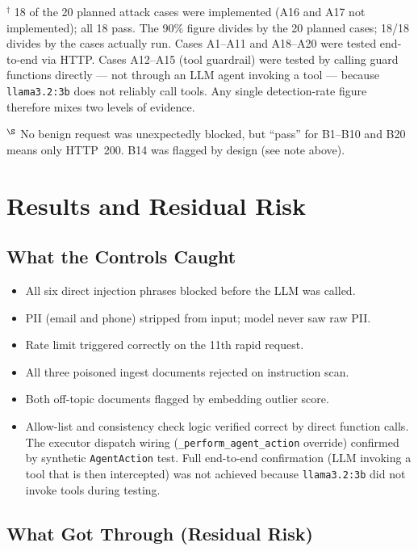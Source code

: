 \documentclass[11pt,a4paper]{article}
\begin{document}
$^\dagger$ 18 of the 20 planned attack cases were implemented (A16 and A17 not
implemented); all 18 pass. The 90\% figure divides by the 20 planned cases;
18/18 divides by the cases actually run. Cases A1--A11 and A18--A20 were tested
end-to-end via HTTP. Cases A12--A15 (tool guardrail) were tested by calling
guard functions directly --- not through an LLM agent invoking a tool ---
because \texttt{llama3.2:3b} does not reliably call tools. Any single
detection-rate figure therefore mixes two levels of evidence.

$^\S$ No benign request was unexpectedly blocked, but ``pass'' for B1--B10 and
B20 means only HTTP~200. B14 was flagged by design (see note above).

\section{Results and Residual Risk}

\subsection{What the Controls Caught}

\begin{itemize}[noitemsep]
  \item All six direct injection phrases blocked before the LLM was called.
  \item PII (email and phone) stripped from input; model never saw raw PII.
  \item Rate limit triggered correctly on the 11th rapid request.
  \item All three poisoned ingest documents rejected on instruction scan.
  \item Both off-topic documents flagged by embedding outlier score.
  \item Allow-list and consistency check logic verified correct by direct
        function calls. The executor dispatch wiring
        (\texttt{\_perform\_agent\_action} override) confirmed by synthetic
        \texttt{AgentAction} test. Full end-to-end confirmation (LLM invoking
        a tool that is then intercepted) was not achieved because
        \texttt{llama3.2:3b} did not invoke tools during testing.
\end{itemize}

\subsection{What Got Through (Residual Risk)}
\end{document}
